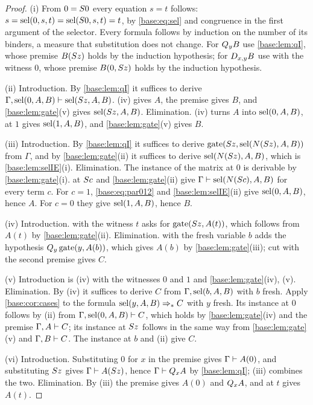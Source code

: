 \begin{proof}
(i) From $0=S 0$ every equation $s=t$ follows:
$s=\operatorname{sel}(0,s,t)=\operatorname{sel}(S 0,s,t)=t$, by \eqref{base:eq:sel} and congruence
in the first argument of the selector.  Every formula follows by induction
on the number of its binders, a measure that substitution does not change.
For $Q_{y}B$ use \cref{base:lem:qI}, whose premise $B(S z)$ holds by the
induction hypothesis; for $D_{x,y}B$ use  with the witness
$0$, whose premise $B(0,S z)$ holds by the induction hypothesis.

(ii) Introduction.  By \cref{base:lem:qI} it suffices to derive
$\Gamma,\operatorname{sel}(0,A,B)\vdash\operatorname{sel}(S z,A,B)$.  (iv) gives
$A$, the premise gives $B$, and \cref{base:lem:gate}(v) gives
$\operatorname{sel}(S z,A,B)$.  Elimination.  (iv) turns $A$ into
$\operatorname{sel}(0,A,B)$,  at $1$ gives $\operatorname{sel}(1,A,B)$, and
\cref{base:lem:gate}(v) gives $B$.

(iii) Introduction.  By \cref{base:lem:qI} it suffices to derive
$\operatorname{gate}(S z,\operatorname{sel}(N(S z),A,B))$ from $\Gamma$, and by
\cref{base:lem:gate}(ii) it suffices to derive $\operatorname{sel}(N(S z),A,B)$, which
is \cref{base:lem:selIE}(i).  Elimination.  The instance of the matrix at
$0$ is derivable by \cref{base:lem:gate}(i).   at $S c$ and
\cref{base:lem:gate}(ii) give $\Gamma\vdash\operatorname{sel}(N(S c),A,B)$ for every
term $c$.  For $c=1$, \eqref{base:eq:par012} and \cref{base:lem:selIE}(ii)
give $\operatorname{sel}(0,A,B)$, hence $A$.  For $c=0$ they give $\operatorname{sel}(1,A,B)$, hence
$B$.

(iv) Introduction.   with the witness $t$ asks for
$\operatorname{gate}(S z,A(t))$, which follows from $A(t)$ by
\cref{base:lem:gate}(ii).  Elimination.   with the fresh
variable $b$ adds the hypothesis $Q_{y}\operatorname{gate}(y,A(b))$, which
gives $A(b)$ by \cref{base:lem:gate}(iii); cut with the second premise gives
$C$.

(v) Introduction is (iv) with the witnesses $0$ and $1$ and
\cref{base:lem:gate}(iv), (v).  Elimination.  By (iv) it suffices to derive
$C$ from $\Gamma,\operatorname{sel}(b,A,B)$ with $b$ fresh.  Apply \cref{base:cor:cases}
to the formula $\operatorname{sel}(y,A,B)\Rightarrow_* C$ with $y$ fresh.  Its instance at
$0$ follows by (ii) from $\Gamma,\operatorname{sel}(0,A,B)\vdash C$, which holds by
\cref{base:lem:gate}(iv) and the premise $\Gamma,A\vdash C$; its instance at
$S z$ follows in the same way from \cref{base:lem:gate}(v) and
$\Gamma,B\vdash C$.  The instance at $b$ and (ii) give $C$.

(vi) Introduction.  Substituting $0$ for $x$ in the premise gives
$\Gamma\vdash A(0)$, and substituting $S z$ gives
$\Gamma\vdash A(S z)$, hence $\Gamma\vdash Q_{x}A$ by
\cref{base:lem:qI}; (iii) combines the two.  Elimination.  By (iii) the
premise gives $A(0)$ and $Q_{x}A$, and  at $t$ gives $A(t)$.
\end{proof}

